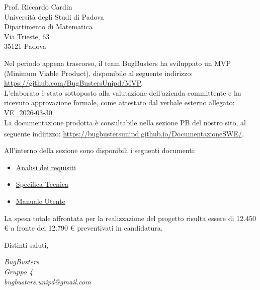 \documentclass[a4paper,11pt]{letter}
\makeatletter
\newcommand{\GruppoFirma}{BugBusters\\Gruppo 4\\bugbusters.unipd@gmail.com}
\makeatother
\begin{document}
\begin{letter}{Prof. Riccardo Cardin\\Universit\`a degli Studi di Padova\\Dipartimento di Matematica\\Via Trieste, 63\\35121 Padova}
\vspace{0.8em}

Nel periodo appena trascorso, il team BugBusters ha sviluppato un MVP (Minimum Viable Product), disponibile al seguente indirizzo: \url{https://github.com/BugBustersUnipd/MVP}. \\
L'elaborato è stato sottoposto alla valutazione dell'azienda committente e ha ricevuto approvazione formale, come attestato dal 
verbale esterno allegato: 
\href{https://bugbustersunipd.github.io/DocumentazioneSWE/PB/VERBALI/ESTERNI/VE_2026-03-30/VE_2026-03-30.pdf}{VE\_2026-03-30}. \\
La documentazione prodotta è consultabile nella sezione PB\textsubscript{} del nostro sito, al seguente indirizzo:
\url{https://bugbustersunipd.github.io/DocumentazioneSWE/}.

All'interno della sezione sono disponibili i seguenti documenti:
\begin{itemize}
\item \href{https://bugbustersunipd.github.io/DocumentazioneSWE/PB/ANALISI\%20DEI\%20REQUISITI/Analisi\%20dei\%20Requisiti.pdf}{Analisi
 dei requisiti}
\item \href{https://bugbustersunipd.github.io/DocumentazioneSWE/PB/SPECIFICA\%20TECNICA/Specifica\%20Tecnica.pdf}{Specifica Tecnica}
\item \href{https://bugbustersunipd.github.io/DocumentazioneSWE/PB/MANUALE%20UTENTE/Manuale%20utente.pdf}{Manuale Utente}
\end{itemize}

\vspace{0.8em}
La spesa totale affrontata per la realizzazione del progetto risulta essere di 12.450 € a fronte dei 12.790 € preventivati in candidatura.

\closing{Distinti saluti,}

\vspace{-5.5em} %

\begin{flushleft}
    \textit{\GruppoFirma}
\end{flushleft}

\end{letter}
\end{document}
